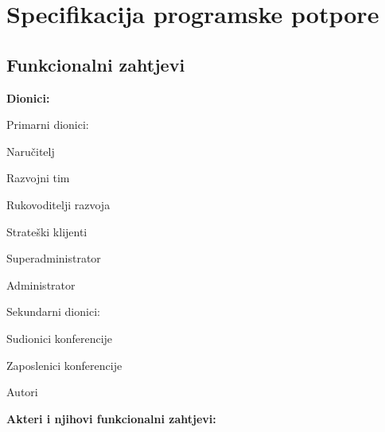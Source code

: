 \chapter{Specifikacija programske potpore}
		
	\section{Funkcionalni zahtjevi}


			\noindent \textbf{Dionici:}
			
			\begin{packed_enum}
				
				\item Primarni dionici:
				
				\begin{packed_enum}
					\item Naručitelj
					\item Razvojni tim
					\item Rukovoditelji razvoja
					\item Strateški klijenti
					\item Superadministrator
					\item Administrator
				\end{packed_enum}
				
				\item Sekundarni dionici:	
				
				\begin{packed_enum}
					\item Sudionici konferencije
					\item Zaposlenici konferencije
					\item Autori	
				\end{packed_enum}		
				
			\end{packed_enum}
			
			\noindent \textbf{Akteri i njihovi funkcionalni zahtjevi:}
			
